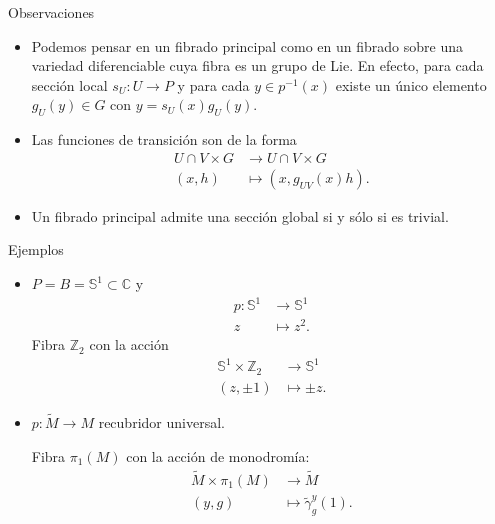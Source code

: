\documentclass{beamer}
\newcommand{\SF}{\mathbb{S}}
\newcommand{\CC}{\mathbb{C}}
\newcommand{\ZZ}{\mathbb{Z}}
\begin{document}
\begin{frame}{Observaciones}
  \begin{itemize}
    \item Podemos pensar en un fibrado principal como en un fibrado sobre una variedad diferenciable cuya fibra es un grupo de Lie. \pause
      En efecto, para cada sección local $s_U:U\rightarrow P$ y para cada $y\in p^{-1}(x)$ existe un único elemento $g_U(y)\in G$ con $y=s_U(x)g_U(y)$. \pause
    \item Las funciones de transición son de la forma
      \begin{align*}
	 U\cap V \times G&\longrightarrow U\cap V\times G\\ 
	 (x,h) &\longmapsto (x,g_{UV}(x)h). 
	\end{align*}
	\pause
      \item Un fibrado principal admite una sección global si y sólo si es trivial.
  \end{itemize}
\end{frame}

\begin{frame}{Ejemplos}
  \begin{itemize}
    \item $P=B=\SF^1\subset \CC$ y 
      \begin{align*}
	p :\SF^1&\longrightarrow \SF^1\\ 
	  z &\longmapsto z^2.
	\end{align*}
	\pause
	Fibra $\ZZ_2$ con la acción
	\begin{align*}
	   \SF^1\times \ZZ_2&\longrightarrow \SF^1\\ 
	    (z,\pm 1) &\longmapsto \pm z. 
	  \end{align*}
	  \pause
	\item $p:\tilde{M}\rightarrow M$ recubridor universal. \pause
	  
	 Fibra $\pi_1(M)$ con la acción de monodromía: 
	\begin{align*}
	  \tilde{M}\times \pi_1(M)&\longrightarrow \tilde{M}\\ 
	  (y,g) &\longmapsto \tilde{\gamma}_g^y(1).
	  \end{align*}
  \end{itemize}
\end{frame}
\end{document}
